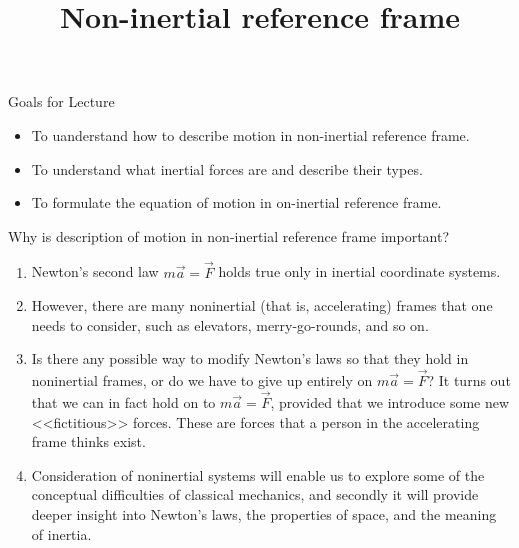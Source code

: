 \documentclass[18pt]{LectMechanics}
\title[Physics 1]{\huge\bfseries Non-inertial reference frame}
\date{}
\begin{document}
%
\begin{frame}
	\titlepage
\end{frame}
\usebackgroundtemplate{
}




\begin{frame}{Goals for Lecture}{}
	\begin{itemize}
		\item To uanderstand how to describe motion in non-inertial reference frame.
		\item To understand what inertial forces are and describe their types.
		\item To formulate the equation of motion in on-inertial reference frame.
	\end{itemize}
\end{frame}

\begin{frame}{Why is description of motion in non-inertial reference frame important?}{}
\begin{enumerate}
	\item Newton's second law $m\vec a =\vec F$ holds true only in inertial coordinate systems.
	\item However, there are many noninertial (that is, accelerating) frames that one needs to
	consider, such as elevators, merry-go-rounds, and so on.

	\item Is there any possible way to modify Newton’s laws so that they hold in noninertial
	frames, or do we have to give up entirely on $m\vec a =\vec F$? It turns out that we can in fact
	hold on to $m\vec a =\vec F$, provided that we introduce some new <<fictitious>> forces. These are
	forces that a person in the accelerating frame thinks exist.
	\item Consideration of noninertial systems will enable us to explore some of the
	conceptual difficulties of classical mechanics, and secondly it will provide deeper
	insight into Newton's laws, the properties of space, and the meaning of inertia.
\end{enumerate}
\end{frame}

\begin{frame}{}{}

\end{frame}
\end{document}
